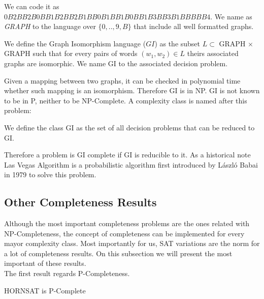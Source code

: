 We can code it as $0B2BB2B0BB1B2BB2B1BB0B1BB1B0BB1B3BB3B1BBBBB4$. We name as \emph{GRAPH} to the language over $\{0,..,9,B\}$ that include all well formatted graphs. \\

\begin{definition}
  We define the Graph Isomorphism language ($GI$) as the subset $L\subset$ GRAPH $\times$ GRAPH such that for every pairs of words $(w_1,w_2)\in L$ theirs associated graphs are isomorphic. We name GI to the associated decision problem. \\
\end{definition}

Given a mapping between two graphs, it can be checked in polynomial time whether such mapping is an isomorphism. Therefore GI is in NP. GI is not known to be in P, neither to be NP-Complete. A complexity class is named after this problem:\\

\begin{definition}
  We define the class GI as the set of all decision problems that can be reduced to GI. \\
\end{definition}


Therefore a problem is GI complete if GI is reducible to it. As a historical note Las Vegas Algorithm is a probabilistic algorithm first introduced by László Babai in 1979 to solve this problem. 


\subsection{Other Completeness Results}

Although the most important completeness problems are the ones related with NP-Completeness, the concept of completeness can be implemented for every mayor complexity class. Most importantly for us, SAT variations are the norm for a lot of completeness results. On this subsection we will present the most important of these results.\\

The first result regards P-Completeness. 

\begin{theorem}\label{theorem:hornsat}  HORNSAT is P-Complete
\end{theorem}


